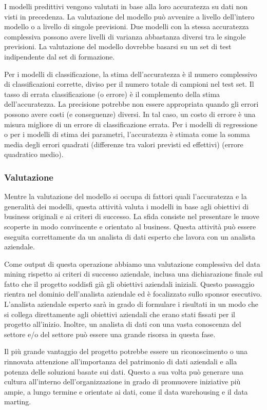 \documentclass[a4paper]{extarticle}
\begin{document}
I modelli predittivi vengono valutati in base alla loro accuratezza su dati non visti in precedenza. La valutazione del modello può avvenire a livello dell'intero modello o a livello di singole previsioni. Due modelli con la stessa accuratezza complessiva possono avere livelli di varianza abbastanza diversi tra le singole previsioni. La valutazione del modello dovrebbe basarsi su un set di test indipendente dal set di formazione.

Per i modelli di classificazione, la stima dell'accuratezza è il numero complessivo di classificazioni corrette, diviso per il numero totale di campioni nel test set. Il tasso di errata classificazione (o errore) è il complemento della stima dell'accuratezza. La precisione potrebbe non essere appropriata quando gli errori possono avere costi (e conseguenze) diversi. In tal caso, un costo di errore è una misura migliore di un errore di classificazione errata. Per i modelli di regressione o per i modelli di stima dei parametri, l'accuratezza è stimata come la somma media degli errori quadrati (differenze tra valori previsti ed effettivi) (errore quadratico medio).

\subsubsection{Valutazione}

Mentre la valutazione del modello si occupa di fattori quali l'accuratezza e la generalità dei modelli, questa attività valuta i modelli in base agli obiettivi di business originali e ai criteri di successo. La sfida consiste nel presentare le nuove scoperte in modo convincente e orientato al business. Questa attività può essere eseguita correttamente da un analista di dati esperto che lavora con un analista aziendale.

Come output di questa operazione abbiamo una valutazione complessiva del data mining rispetto ai criteri di successo aziendale, inclusa una dichiarazione finale sul fatto che il progetto soddisfi già gli obiettivi aziendali iniziali. Questo passaggio rientra nel dominio dell'analista aziendale ed è focalizzato sullo sponsor esecutivo. L'analista aziendale esperto sarà in grado di formulare i risultati in un modo che si collega direttamente agli obiettivi aziendali che erano stati fissati per il progetto all'inizio. Inoltre, un analista di dati con una vasta conoscenza del settore e/o del settore può essere una grande risorsa in questa fase.

Il più grande vantaggio del progetto potrebbe essere un riconoscimento o una rinnovata attenzione all'importanza del patrimonio di dati aziendali e alla potenza delle soluzioni basate sui dati. Questo a sua volta può generare una cultura all'interno dell'organizzazione in grado di promuovere iniziative più ampie, a lungo termine e orientate ai dati, come il data warehousing e il data marting.
\end{document}
